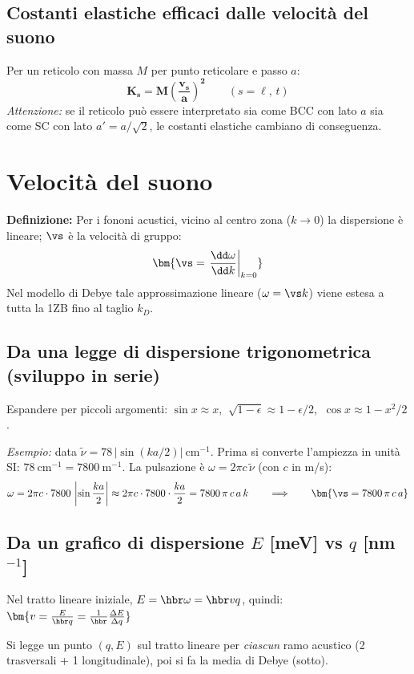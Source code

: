 \subsection{Costanti elastiche efficaci dalle velocità del suono}
Per un reticolo con massa $M$ per punto reticolare e passo $a$:
\[ \bm{K_s = M\left(\frac{v_s}{a}\right)^{\!2}} \qquad (s=\ell,\,t) \]
\textit{Attenzione:} se il reticolo può essere interpretato sia come BCC con lato $a$ sia come SC con lato $a'=a/\sqrt2$, le costanti elastiche cambiano di conseguenza.


\newpage 
\section{Velocità del suono}

\textbf{Definizione:} Per i fononi acustici, vicino al centro zona ($k\to0$) la dispersione è lineare; $\vs$ è la velocità di gruppo:
\[ \bm{\vs = \left.\frac{\dd\omega}{\dd k}\right|_{k=0}} \]
Nel modello di Debye tale approssimazione lineare ($\omega=\vs k$) viene estesa a tutta la 1ZB fino al taglio $k_D$.

\subsection{Da una legge di dispersione trigonometrica (sviluppo in serie)}
Espandere per piccoli argomenti: $\sin x \approx x$, $\ \sqrt{1-\epsilon}\approx 1-\epsilon/2$, $\ \cos x \approx 1-x^2/2$.

\textit{Esempio:} data $\tilde\nu = 78\,|\sin(ka/2)|\ \text{cm}^{-1}$. Prima si converte l'ampiezza in unità SI: $78\ \text{cm}^{-1} = 7800\ \text{m}^{-1}$. La pulsazione è $\omega = 2\pi c\,\tilde\nu$ (con $c$ in m/s):
\[ \omega = 2\pi c\cdot 7800\,\left|\sin\frac{ka}{2}\right| \approx 2\pi c\cdot 7800\cdot\frac{ka}{2} = 7800\,\pi\,c\,a\,k
   \qquad\Longrightarrow\qquad \bm{\vs = 7800\,\pi\,c\,a} \]

\subsection{Da un grafico di dispersione $E$ [meV] vs $q$ [nm$^{-1}$]}
Nel tratto lineare iniziale, $E=\hbr\omega = \hbr v q$, quindi: $\bm{v = \frac{E}{\hbr q} = \frac{1}{\hbr}\frac{\Delta E}{\Delta q}}$

Si legge un punto $(q,E)$ sul tratto lineare per \emph{ciascun} ramo acustico (2 trasversali + 1 longitudinale), poi si fa la media di Debye (sotto).

